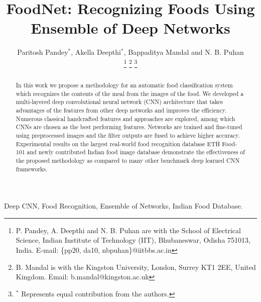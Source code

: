 \documentclass[journal]{IEEEtran}%
\begin{document}
\title{FoodNet: Recognizing Foods Using Ensemble of Deep Networks}

\author{Paritosh Pandey$^*$, Akella Deepthi$^*$, Bappaditya Mandal
        and N. B. Puhan %

\thanks{P. Pandey, A. Deepthi and N. B. Puhan are with the School of Electrical Science, Indian Institute of Technology (IIT), Bhubaneswar, Odisha 751013, India. E-mail: \{pp20, da10, nbpuhan\}@iitbbs.ac.in}%
\thanks{B. Mandal is with the Kingston University, London, Surrey KT1 2EE, United Kingdom. Email: b.mandal@kingston.ac.uk}%
\thanks{$^*$ Represents equal contribution from the authors.}
}



{}

\maketitle

\begin{abstract}
In this work we propose a methodology for an automatic food classification system which recognizes the contents of the meal from the images of the food. We developed a multi-layered deep convolutional neural network (CNN) architecture that takes advantages of the features from other deep networks and improves the efficiency. Numerous classical handcrafted features and approaches are explored, among which CNNs are chosen as the best performing features. Networks are trained and fine-tuned using preprocessed images and the filter outputs are fused to achieve higher accuracy. Experimental results on the largest real-world food recognition database ETH Food-101 and newly contributed Indian food image database demonstrate the effectiveness of the proposed methodology as compared to many other benchmark deep learned CNN frameworks.
\end{abstract}

\begin{IEEEkeywords}
Deep CNN, Food Recognition, Ensemble of Networks, Indian Food Database.
\end{IEEEkeywords}

\IEEEpeerreviewmaketitle
\end{document}
